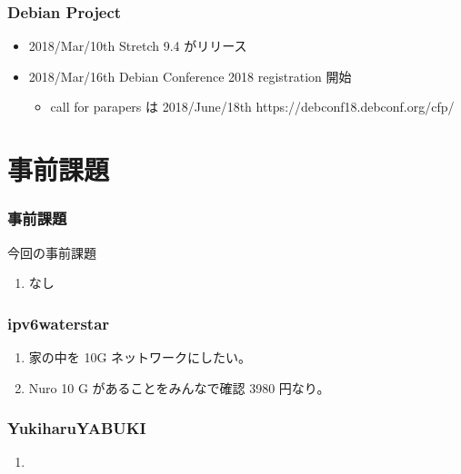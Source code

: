 \documentclass[cjk,dvipdfmx,10pt,compress,%
hyperref={bookmarks=true,bookmarksnumbered=true,bookmarksopen=false,%
colorlinks=false,%
pdftitle={第 132 回 関西 Debian 勉強会},%
pdfauthor={かわだ},%
pdfsubject={資料},%
}]{beamer}
\begin{document}
\begin{frame}[fragile]
  \frametitle{Debian Project}
  \begin{itemize}
  \item 2018/Mar/10th Stretch 9.4 がリリース
  \item 2018/Mar/16th Debian Conference 2018 registration 開始 
  	\begin{itemize}
 		\item call for parapers は 2018/June/18th https://debconf18.debconf.org/cfp/  
  	\end{itemize}
  \end{itemize}
\end{frame}


\section{事前課題}

\begin{frame}[fragile]
  \frametitle{事前課題}
  \begin{block}{今回の事前課題}
    \begin{enumerate}
    \item なし
    \end{enumerate}
  \end{block}
\end{frame}


\begin{frame}
  \frametitle{ ipv6waterstar }
  \begin{enumerate}
  \item 家の中を 10G ネットワークにしたい。
  \item Nuro 10 G があることをみんなで確認 3980 円なり。
  \end{enumerate}
\end{frame}

\begin{frame}
  \frametitle{YukiharuYABUKI}
  \begin{enumerate}
  \item 
  \end{enumerate}
\end{frame}
\end{document}
